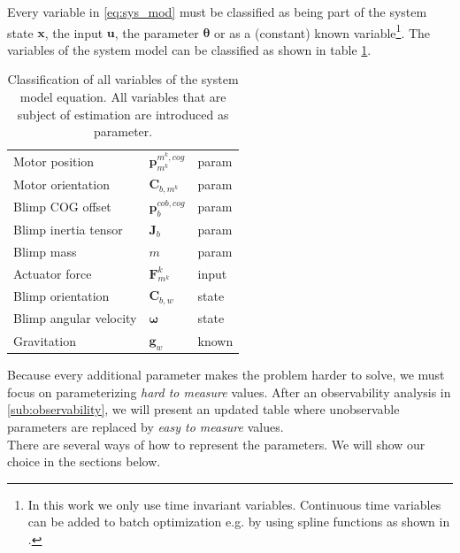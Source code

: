 Every variable in \cref{eq:sys_mod} must be classified as being part of the system state $\mathbf{x}$, the input $\mathbf{u}$, the parameter $\boldsymbol{\theta}$ or as a (constant) known variable\footnote{In this work we only use time invariant variables.
Continuous time variables can be added to batch optimization e.g. by using spline functions as shown in \citep{Furgale2012}.}.
The variables of the system model can be classified as shown in table \ref{tab:params}.

\begin{table}[htb!]
\centering
\begin{tabular}{lll}
\hline
Motor position & $\mathbf{p}^{m^k,cog}_{m^k}$ 	& param \\
Motor orientation & $\mathbf{C}_{b,m^k}$ 		& param \\
Blimp COG offset & $\mathbf{p}^{cob,cog}_b$ 	& param \\
Blimp inertia tensor & $\mathbf{J}_b$ 			& param \\
Blimp mass & $m$ 								& param \\
Actuator force & $\mathbf{F}_{m^k}^k$ 			& input \\
Blimp orientation & $\mathbf{C}_{b,w}$ 			& state \\
Blimp angular velocity & $\boldsymbol{\omega}$ 	& state \\
Gravitation & $\mathbf{g}_w$ 					& known \\
\hline
\end{tabular}
\caption{Classification of all variables of the system model equation. All variables that are subject of estimation are introduced as parameter.}
\label{tab:params}
\end{table}

Because every additional parameter makes the problem harder to solve, we must focus on parameterizing \textit{hard to measure} values.
After an observability analysis in \cref{sub:observability}, we will present an updated table where unobservable parameters are replaced by \textit{easy to measure} values.
\\

There are several ways of how to represent the parameters.
We will show our choice in the sections below.

